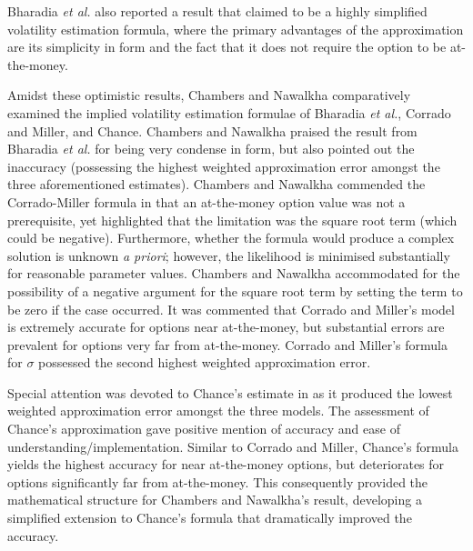 Bharadia \emph{et al.} \cite{Bharadia1996} also reported a result that claimed to be a highly simplified volatility estimation formula, where the primary advantages of the approximation are its simplicity in form and the fact that it does not require the option to be at-the-money.

Amidst these optimistic results, Chambers and Nawalkha \cite{Chambers2001} comparatively examined the implied volatility estimation formulae of Bharadia \emph{et al.}, Corrado and Miller, and Chance. Chambers and Nawalkha praised the result from Bharadia \emph{et al.} for being very condense in form, but also pointed out the inaccuracy (possessing the highest weighted approximation error amongst the three aforementioned estimates). Chambers and Nawalkha commended the Corrado-Miller formula in that an at-the-money option value was not a prerequisite, yet highlighted that the limitation was the square root term (which could be negative). Furthermore, whether the formula would produce a complex solution is unknown \emph{a priori}; however, the likelihood is minimised substantially for reasonable parameter values. Chambers and Nawalkha accommodated for the possibility of a negative argument for the square root term by setting the term to be zero if the case occurred. It was commented that Corrado and Miller's model is extremely accurate for options near at-the-money, but substantial errors are prevalent for options very far from at-the-money. Corrado and Miller's formula for $\sigma$ possessed the second highest weighted approximation error.

Special attention was devoted to Chance's estimate in \cite{Chambers2001} as it produced the lowest weighted approximation error amongst the three models. The assessment of Chance's approximation gave positive mention of accuracy and ease of understanding/implementation. Similar to Corrado and Miller, Chance's formula yields the highest accuracy for near at-the-money options, but deteriorates for options significantly far from at-the-money.
This consequently provided the mathematical structure for Chambers and Nawalkha's result, developing a simplified extension to Chance's formula that dramatically improved the accuracy.

